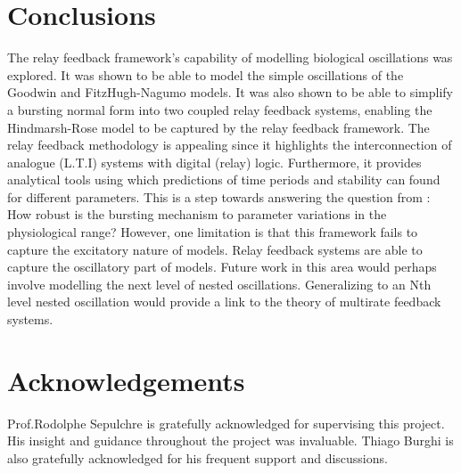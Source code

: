 \documentclass[a4paper, 12pt]{article}
\begin{document}
\section{Conclusions}
The relay feedback framework's capability of modelling biological oscillations was explored. It was shown to be able to model the simple oscillations of the Goodwin and FitzHugh-Nagumo models. It was also shown to be able to simplify a bursting normal form into two coupled relay feedback systems, enabling the Hindmarsh-Rose model to be captured by the relay feedback framework. The relay feedback methodology is appealing since it highlights the interconnection of analogue (L.T.I) systems with digital (relay) logic. Furthermore, it provides analytical tools using which predictions of time periods and stability can found for different parameters. This is a step towards answering the question from \cite{rinzel}: How robust is the bursting mechanism to parameter variations in the physiological range?  However, one limitation is that this framework fails to capture the excitatory nature of models. Relay feedback systems are able to capture the oscillatory part of models. Future work in this area would perhaps involve modelling the next level of nested oscillations. Generalizing to an Nth level nested oscillation would provide a link to the theory of multirate feedback systems.


\section{Acknowledgements}
Prof.Rodolphe Sepulchre is gratefully acknowledged for supervising this project. His insight and guidance throughout the project was invaluable. Thiago Burghi is also gratefully acknowledged for his frequent support and discussions. 
\end{document}
